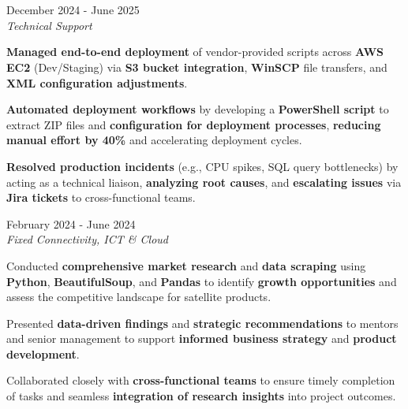 \documentclass[../main.tex]{subfiles}
\begin{document}
\section{}

\begin{twocolentry}{December 2024 - June 2025}
     \\
    \vspace{0.10 cm}
    \textit{Technical Support}
\end{twocolentry}

\vspace{0.10 cm}
\begin{onecolentry}
\begin{highlights}
    \item \textbf{Managed end-to-end deployment} of vendor-provided scripts across \textbf{AWS EC2} (Dev/Staging) via \textbf{S3 bucket integration}, \textbf{WinSCP} file transfers, and \textbf{XML configuration adjustments}.
    \item \textbf{Automated deployment workflows} by developing a \textbf{PowerShell script} to extract ZIP files and \textbf{configuration for deployment processes}, \textbf{reducing manual effort by 40\%} and accelerating deployment cycles.
    \item \textbf{Resolved production incidents} (e.g., CPU spikes, SQL query bottlenecks) by acting as a technical liaison, \textbf{analyzing root causes}, and \textbf{escalating issues} via \textbf{Jira tickets} to cross-functional teams.
\end{highlights}
\end{onecolentry}

\vspace{0.4 cm}

\begin{twocolentry}{February 2024 - June 2024}
     \\
    \vspace{0.10 cm}
    \textit{Fixed Connectivity, ICT \& Cloud}
\end{twocolentry}

\vspace{0.10 cm}
\begin{onecolentry}
\begin{highlights}
    \item Conducted \textbf{comprehensive market research} and \textbf{data scraping} using \textbf{Python}, \textbf{BeautifulSoup}, and \textbf{Pandas} to identify \textbf{growth opportunities} and assess the competitive landscape for satellite products.
    \item Presented \textbf{data-driven findings} and \textbf{strategic recommendations} to mentors and senior management to support \textbf{informed business strategy} and \textbf{product development}.
    \item Collaborated closely with \textbf{cross-functional teams} to ensure timely completion of tasks and seamless \textbf{integration of research insights} into project outcomes.
\end{highlights}
\end{onecolentry}
\end{document}
